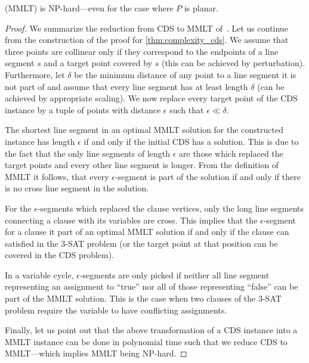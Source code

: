 \begin{theorem}
   (\gls{MMLT}) is NP-hard---even for the case
  where \(P\) is planar.
  \begin{proof}
  We summarize the reduction from \gls{CDS} to \gls{MMLT}
  of~\cite{mmlt_complexity}. Let us continue from the construction of
  the proof for \cref{thm:complexity_cds}. We assume that three points
  are collinear only if they correspond to the endpoints of a line
  segment \(s\) and a target point covered by \(s\) (this can be
  achieved by perturbation). Furthermore, let \(\delta\) be the
  minimum distance of any point to a line segment it is not part of
  and assume that every line segment has at least length \(\delta\)
  (can be achieved by appropriate scaling). We now replace every
  target point of the \gls{CDS} instance by a tuple of points with
  distance \(\epsilon\) such that \(\epsilon \ll \delta\).
  
  The shortest line segment in an optimal \gls{MMLT} solution for the
  constructed instance has length \(\epsilon\) if and only if the
  initial \gls{CDS} has a solution. This is due to the fact that the
  only line segments of length \(\epsilon\) are those which replaced
  the target points and every other line segment is longer. From the
  definition of \gls{MMLT} it follows, that every \(\epsilon\)-segment
  is part of the solution if and only if there is no \gls{cross}
  line segment in the solution. 
  
  For the \(\epsilon\)-segments which
  replaced the clause vertices, only the long line segments connecting
  a clause with its variables are \gls{cross}. This implies that the
  \(\epsilon\)-segment for a clause it part of an optimal \gls{MMLT} 
  solution if and only if the clause can satisfied in the 3-SAT
  problem (or the target point at that position can be covered in the
  \gls{CDS} problem).
  
  In a variable cycle, \(\epsilon\)-segments are only picked if
  neither all line segment representing an assignment to ``true'' nor
  all of those representing ``false'' can be part of the \gls{MMLT}
  solution. This is the case when two clauses of the 3-SAT problem
  require the variable to have conflicting assignments.
  
  Finally, let us point out that the above transformation of a
  \gls{CDS} instance into a \gls{MMLT} instance can be done in
  polynomial time such that we reduce \gls{CDS} to \gls{MMLT}---which
  implies \gls{MMLT} being NP-hard.
  \end{proof}
\end{theorem}

